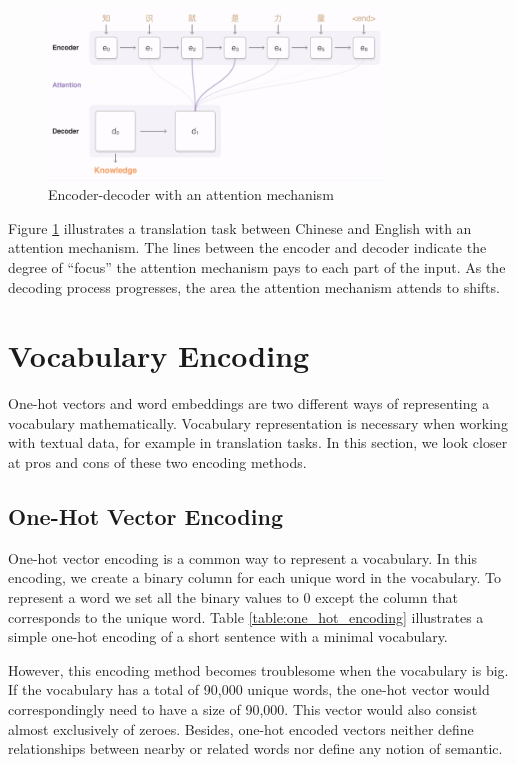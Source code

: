 \begin{figure}[ht]
    \centering
    \includegraphics[width=0.8\textwidth]{fig/background_theory/attention_chinese.png}
    \caption{Encoder-decoder with an attention mechanism}
    \label{fig:encoder-decoder-attention-google}
\end{figure}

Figure \ref{fig:encoder-decoder-attention-google} illustrates a translation task between Chinese and English with an attention mechanism. The lines between the encoder and decoder indicate the degree of ``focus'' the attention mechanism pays to each part of the input. As the decoding process progresses, the area the attention mechanism attends to shifts.


\section{Vocabulary Encoding}
\label{sec:vocabulary_encoding}
One-hot vectors and word embeddings are two different ways of representing a vocabulary mathematically. Vocabulary representation is necessary when working with textual data, for example in translation tasks. In this section, we look closer at pros and cons of these two encoding methods.

\subsection{One-Hot Vector Encoding}
One-hot vector encoding is a common way to represent a vocabulary. In this encoding, we create a binary column for each unique word in the vocabulary. To represent a word we set all the binary values to \(0\) except the column that corresponds to the unique word. Table \ref{table:one_hot_encoding} illustrates a simple one-hot encoding of a short sentence with a minimal vocabulary. 

However, this encoding method becomes troublesome when the vocabulary is big. If the vocabulary has a total of 90,000 unique words, the one-hot vector would correspondingly need to have a size of 90,000. This vector would also consist almost exclusively of zeroes. Besides, one-hot encoded vectors neither define relationships between nearby or related words nor define any notion of semantic.

